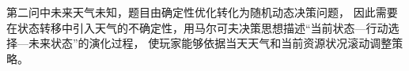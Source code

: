 第二问中未来天气未知，题目由确定性优化转化为随机动态决策问题，
%
因此需要在状态转移中引入天气的不确定性，用马尔可夫决策思想描述“当前状态—行动选择—未来状态”的演化过程，
%
使玩家能够依据当天天气和当前资源状况滚动调整策略。